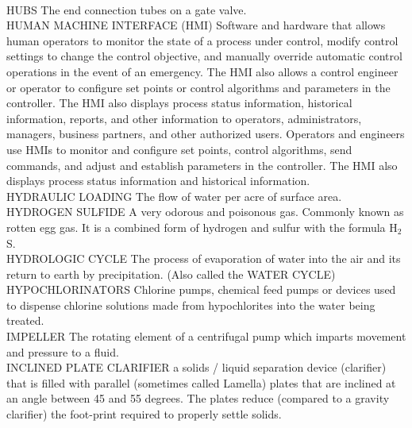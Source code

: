\documentclass{article}
\begin{document}
\vspace{0.3cm}\\
HUBS
The end connection tubes on a gate valve.
\vspace{0.3cm}\\
HUMAN MACHINE INTERFACE (HMI)
Software and hardware that allows human operators to monitor the state of a process under control, modify control settings to change the control objective, and manually override automatic control operations in the event of an emergency. The HMI also allows a control engineer or operator to configure set points or control algorithms and parameters in the controller. The HMI also displays process status information, historical information, reports, and other information to operators, administrators, managers, business partners, and other authorized users. Operators and engineers use HMIs to monitor and configure set points, control algorithms, send commands, and adjust and establish parameters in the controller. The HMI also displays process status information and historical information.
\vspace{0.3cm}\\
HYDRAULIC LOADING
The flow of water per acre of surface area.
\vspace{0.3cm}\\
HYDROGEN SULFIDE
A very odorous and poisonous gas. Commonly known as rotten egg gas. It is a combined form of hydrogen and sulfur with the formula H$_2$S.
\vspace{0.3cm}\\
HYDROLOGIC CYCLE
The process of evaporation of water into the air and its return to earth by precipitation. (Also called the WATER CYCLE)
\vspace{0.3cm}\\
HYPOCHLORINATORS
Chlorine pumps, chemical feed pumps or devices used to dispense chlorine solutions made from hypochlorites into the water being treated.
\vspace{0.3cm}\\
IMPELLER
The rotating element of a centrifugal pump which imparts movement and pressure to a fluid.
\vspace{0.3cm}\\
INCLINED PLATE CLARIFIER
a solids / liquid separation device (clarifier) that is filled with parallel (sometimes called Lamella) plates that are inclined at an angle between 45 and 55 degrees. The plates reduce (compared to a gravity clarifier) the foot-print required to properly settle solids.
\vspace{0.3cm}\\
\end{document}
